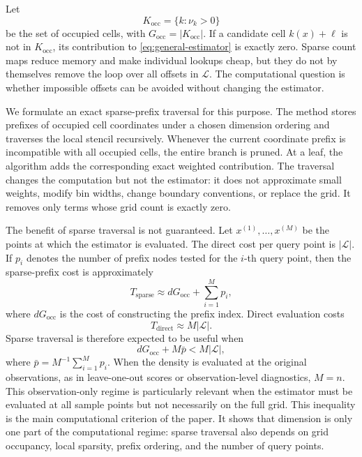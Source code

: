 \documentclass[pdflatex,sn-mathphys-ay]{sn-jnl}
\theoremstyle{thmstyleone}
\newcommand{\stencil}{\mathcal{L}}
\begin{document}
Let
\[
K_{\mathrm{occ}}
=
\{k:\nu_k>0\}
\]
be the set of occupied cells, with \(G_{\mathrm{occ}}=|K_{\mathrm{occ}}|\). If a candidate cell \(k(x)+\ell\) is not in \(K_{\mathrm{occ}}\), its contribution to \eqref{eq:general-estimator} is exactly zero. Sparse count maps reduce memory and make individual lookups cheap, but they do not by themselves remove the loop over all offsets in \(\stencil\). The computational question is whether impossible offsets can be avoided without changing the estimator.

We formulate an exact sparse-prefix traversal for this purpose. The method stores prefixes of occupied cell coordinates under a chosen dimension ordering and traverses the local stencil recursively. Whenever the current coordinate prefix is incompatible with all occupied cells, the entire branch is pruned. At a leaf, the algorithm adds the corresponding exact weighted contribution. The traversal changes the computation but not the estimator: it does not approximate small weights, modify bin widths, change boundary conventions, or replace the grid. It removes only terms whose grid count is exactly zero.

The benefit of sparse traversal is not guaranteed. Let \(x^{(1)},\ldots,x^{(M)}\) be the points at which the estimator is evaluated. The direct cost per query point is \(|\stencil|\). If \(p_i\) denotes the number of prefix nodes tested for the \(i\)-th query point, then the sparse-prefix cost is approximately
\begin{equation}
T_{\mathrm{sparse}}
\approx
dG_{\mathrm{occ}}+\sum_{i=1}^M p_i,
\label{eq:sparse-cost}
\end{equation}
where \(dG_{\mathrm{occ}}\) is the cost of constructing the prefix index. Direct evaluation costs
\begin{equation}
T_{\mathrm{direct}}
\approx
M|\stencil|.
\label{eq:direct-cost}
\end{equation}
Sparse traversal is therefore expected to be useful when
\begin{equation}
dG_{\mathrm{occ}}+M\bar p
<
M|\stencil|,
\label{eq:mode-criterion}
\end{equation}
where \(\bar p=M^{-1}\sum_{i=1}^M p_i\). When the density is evaluated at the original observations, as in leave-one-out scores or observation-level diagnostics, \(M=n\). This observation-only regime is particularly relevant when the estimator must be evaluated at all sample points but not necessarily on the full grid. This inequality is the main computational criterion of the paper. It shows that dimension is only one part of the computational regime: sparse traversal also depends on grid occupancy, local sparsity, prefix ordering, and the number of query points.
\end{document}
